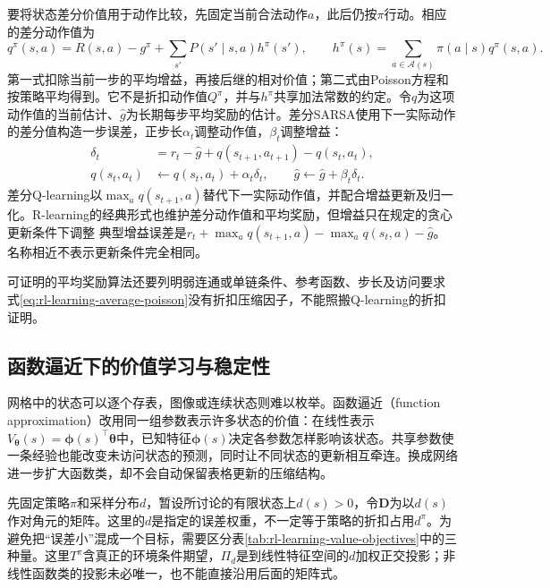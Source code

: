 要将状态差分价值用于动作比较，先固定当前合法动作$a$，此后仍按$\pi$行动。相应的差分动作值为
\[
  q^\pi(s,a)=R(s,a)-g^\pi
       +\sum_{s'}P(s'\mid s,a)h^\pi(s'),\qquad
  h^\pi(s)=\sum_{a\in\mathcal A(s)}\pi(a\mid s)q^\pi(s,a).
\]
第一式扣除当前一步的平均增益，再接后继的相对价值；第二式由Poisson方程和按策略平均得到。它不是折扣动作值$Q^\pi$，并与$h^\pi$共享加法常数的约定。令$q$为这项动作值的当前估计、$\widehat g$为长期每步平均奖励的估计。差分SARSA使用下一实际动作的差分值构造一步误差，正步长$\alpha_t$调整动作值，$\beta_t$调整增益：
\[
  \begin{aligned}
    \delta_t&=r_t-\widehat g+q(s_{t+1},a_{t+1})-q(s_t,a_t),\\
    q(s_t,a_t)&\leftarrow q(s_t,a_t)+\alpha_t\delta_t,\qquad
    \widehat g\leftarrow\widehat g+\beta_t\delta_t .
  \end{aligned}
\]
差分Q-learning以$\max_a q(s_{t+1},a)$替代下一实际动作值，并配合增益更新及归一化。R-learning的经典形式也维护差分动作值和平均奖励，但增益只在规定的贪心更新条件下调整
典型增益误差是$r_t+\max_aq(s_{t+1},a)-\max_aq(s_t,a)-\widehat g$。名称相近不表示更新条件完全相同。

可证明的平均奖励算法还要列明弱连通或单链条件、参考函数、步长及访问要求
式\eqref{eq:rl-learning-average-poisson}没有折扣压缩因子，不能照搬Q-learning的折扣证明。

\subsection{函数逼近下的价值学习与稳定性}
\label{sec:rl-learning-approximation}

网格中的状态可以逐个存表，图像或连续状态则难以枚举。函数逼近（function approximation）改用同一组参数表示许多状态的价值：在线性表示$V_{\bm{\theta}}(s)=\bm{\phi}(s)^\top\bm{\theta}$中，已知特征$\bm\phi(s)$决定各参数怎样影响该状态。共享参数使一条经验也能改变未访问状态的预测，同时让不同状态的更新相互牵连。换成网络进一步扩大函数类，却不会自动保留表格更新的压缩结构。

先固定策略$\pi$和采样分布$d$，暂设所讨论的有限状态上$d(s)>0$，令$\bm{D}$为以$d(s)$作对角元的矩阵。这里的$d$是指定的误差权重，不一定等于策略的折扣占用$d^\pi$。为避免把“误差小”混成一个目标，需要区分表\ref{tab:rl-learning-value-objectives}中的三种量。这里$T^\pi$含真正的环境条件期望，$\Pi_d$是到线性特征空间的$d$加权正交投影；非线性函数类的投影未必唯一，也不能直接沿用后面的矩阵式。

